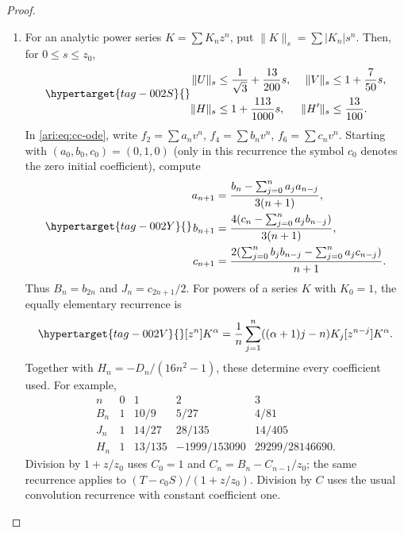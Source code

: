 \begin{proof}
\begin{enumerate}[label=\arabic*.,leftmargin=*]
\item For an analytic
power series $K=\sum K_nz^n$, put
$\|K\|_s=\sum|K_n|s^n$. Then, for $0\le s\le z_0$,
\begin{equation}\hypertarget{tag-002S}{}\label{ari:eq:cc-norms}
 \begin{aligned}
 \|U\|_s&\le\frac1{\sqrt3}+\frac{13}{200}s,&
 \|V\|_s&\le1+\frac7{50}s,\\
 \|H\|_s&\le1+\frac{113}{1000}s,&
 \|H'\|_s&\le\frac{13}{100}.
 \end{aligned}
\end{equation}
In
\eqref{ari:eq:cc-ode}, write $f_2=\sum a_nv^n$,
$f_4=\sum b_nv^n$, $f_6=\sum c_nv^n$. Starting with
$(a_0,b_0,c_0)=(0,1,0)$ (only in this recurrence the symbol
$c_0$ denotes the zero initial coefficient), compute
\begin{equation}\hypertarget{tag-002Y}{}\label{ari:eq:cc-recurrence}
 \begin{aligned}
 a_{n+1}&=\frac{b_n-\sum_{j=0}^na_ja_{n-j}}{3(n+1)},\\
 b_{n+1}&=\frac{4(c_n-\sum_{j=0}^na_jb_{n-j})}{3(n+1)},\\
 c_{n+1}&=\frac{2(\sum_{j=0}^nb_jb_{n-j}-
                          \sum_{j=0}^na_jc_{n-j})}{n+1}.
 \end{aligned}
\end{equation}
Thus $B_n=b_{2n}$ and $J_n=c_{2n+1}/2$. For powers of a series
$K$ with $K_0=1$, the equally elementary recurrence is
\begin{equation}\hypertarget{tag-002V}{}\label{ari:eq:cc-power}
 [z^n]K^\alpha=\frac1n\sum_{j=1}^n
                 ((\alpha+1)j-n)K_j[z^{n-j}]K^\alpha.
\end{equation}
Together with $H_n=-D_n/(16n^2-1)$, these determine every
coefficient used. For example,
\[
 \begin{array}{c|rrrr}
 n&0&1&2&3\\ \hline
 B_n&1&10/9&5/27&4/81\\
 J_n&1&14/27&28/135&14/405\\
 H_n&1&13/135&-1999/153090&29299/28146690.
 \end{array}
\]
Division by $1+z/z_0$ uses $C_0=1$ and
$C_n=B_n-C_{n-1}/z_0$; the same recurrence applies to
$(T-c_0S)/(1+z/z_0)$. Division by $C$ uses the usual
convolution recurrence with constant coefficient one.


\end{enumerate}
\end{proof}
